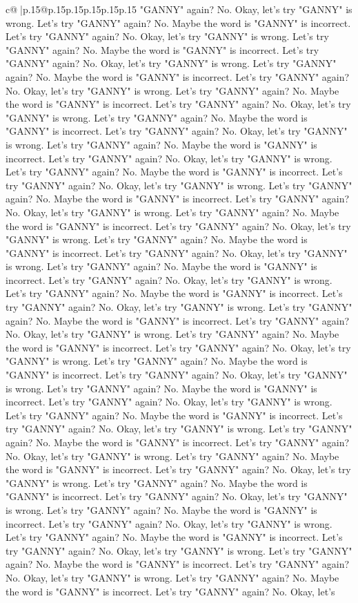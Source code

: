 \documentclass{article}
\begin{document}
{\begin{supertabular}{c@{$\;$}|p{.15\linewidth}@{}p{.15\linewidth}p{.15\linewidth}p{.15\linewidth}p{.15\linewidth}p{.15\linewidth}}
{{{"GANNY" again? No. Okay, let's try "GANNY" is wrong. Let's try "GANNY" again? No. Maybe the word is "GANNY" is incorrect. Let's try "GANNY" again? No. Okay, let's try "GANNY" is wrong. Let's try "GANNY" again? No. Maybe the word is "GANNY" is incorrect. Let's try "GANNY" again? No. Okay, let's try "GANNY" is wrong. Let's try "GANNY" again? No. Maybe the word is "GANNY" is incorrect. Let's try "GANNY" again? No. Okay, let's try "GANNY" is wrong. Let's try "GANNY" again? No. Maybe the word is "GANNY" is incorrect. Let's try "GANNY" again? No. Okay, let's try "GANNY" is wrong. Let's try "GANNY" again? No. Maybe the word is "GANNY" is incorrect. Let's try "GANNY" again? No. Okay, let's try "GANNY" is wrong. Let's try "GANNY" again? No. Maybe the word is "GANNY" is incorrect. Let's try "GANNY" again? No. Okay, let's try "GANNY" is wrong. Let's try "GANNY" again? No. Maybe the word is "GANNY" is incorrect. Let's try "GANNY" again? No. Okay, let's try "GANNY" is wrong. Let's try "GANNY" again? No. Maybe the word is "GANNY" is incorrect. Let's try "GANNY" again? No. Okay, let's try "GANNY" is wrong. Let's try "GANNY" again? No. Maybe the word is "GANNY" is incorrect. Let's try "GANNY" again? No. Okay, let's try "GANNY" is wrong. Let's try "GANNY" again? No. Maybe the word is "GANNY" is incorrect. Let's try "GANNY" again? No. Okay, let's try "GANNY" is wrong. Let's try "GANNY" again? No. Maybe the word is "GANNY" is incorrect. Let's try "GANNY" again? No. Okay, let's try "GANNY" is wrong. Let's try "GANNY" again? No. Maybe the word is "GANNY" is incorrect. Let's try "GANNY" again? No. Okay, let's try "GANNY" is wrong. Let's try "GANNY" again? No. Maybe the word is "GANNY" is incorrect. Let's try "GANNY" again? No. Okay, let's try "GANNY" is wrong. Let's try "GANNY" again? No. Maybe the word is "GANNY" is incorrect. Let's try "GANNY" again? No. Okay, let's try "GANNY" is wrong. Let's try "GANNY" again? No. Maybe the word is "GANNY" is incorrect. Let's try "GANNY" again? No. Okay, let's try "GANNY" is wrong. Let's try "GANNY" again? No. Maybe the word is "GANNY" is incorrect. Let's try "GANNY" again? No. Okay, let's try "GANNY" is wrong. Let's try "GANNY" again? No. Maybe the word is "GANNY" is incorrect. Let's try "GANNY" again? No. Okay, let's try "GANNY" is wrong. Let's try "GANNY" again? No. Maybe the word is "GANNY" is incorrect. Let's try "GANNY" again? No. Okay, let's try "GANNY" is wrong. Let's try "GANNY" again? No. Maybe the word is "GANNY" is incorrect. Let's try "GANNY" again? No. Okay, let's try "GANNY" is wrong. Let's try "GANNY" again? No. Maybe the word is "GANNY" is incorrect. Let's try "GANNY" again? No. Okay, let's try "GANNY" is wrong. Let's try "GANNY" again? No. Maybe the word is "GANNY" is incorrect. Let's try "GANNY" again? No. Okay, let's try "GANNY" is wrong. Let's try "GANNY" again? No. Maybe the word is "GANNY" is incorrect. Let's try "GANNY" again? No. Okay, let's try "GANNY" is wrong. Let's try "GANNY" again? No. Maybe the word is "GANNY" is incorrect. Let's try "GANNY" again? No. Okay, let's try "GANNY" is wrong. Let's try "GANNY" again? No. Maybe the word is "GANNY" is incorrect. Let's try "GANNY" again? No. Okay, let's }}}
\end{supertabular}}
\end{document}
